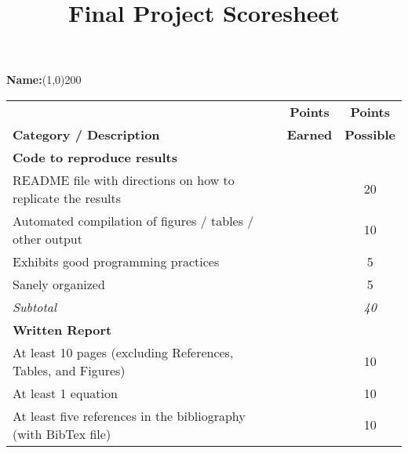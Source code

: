 \documentclass[12pt,english]{article}
\begin{document}

\title{\textbf{Final Project Scoresheet}}
\author{}
\date{}

\maketitle
\thispagestyle{empty}
\bigskip{}

\flushleft \textbf{Name:}\line(1,0){200}

\begin{center}
\begin{tabular}{l|c|c}
\hline
                                & \textbf{Points} & \textbf{Points} \\
\textbf{Category / Description} & \textbf{Earned} & \textbf{Possible} \\
\hline
\textbf{Code to reproduce results}                                                           &               &                          \\
README file with directions on how to replicate the results                                  &               & 20                       \\
Automated compilation of figures / tables / other output                                     &               & 10                       \\
Exhibits good programming practices                                                          &               & 5                        \\
Sanely organized                                                                             &               & 5                        \\
\hline
\textit{Subtotal}                                                                            &               & \textit{40}              \\
\hline
\textbf{Written Report}                                                                      &               &                          \\
At least 10 pages (excluding References, Tables, and Figures)                                &               & 10                       \\
At least 1 equation                                                                          &               & 10                       \\
At least five references in the bibliography (with BibTex file)                              &               & 10                       \\

\end{tabular}
\end{center}
\end{document}
